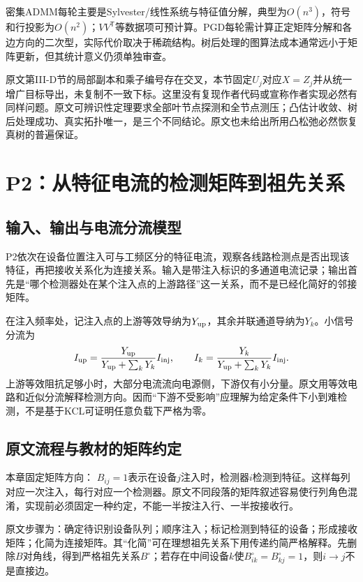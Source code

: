 密集ADMM每轮主要是Sylvester/线性系统与特征值分解，典型为$O(n^3)$，符号和行投影为$O(n^2)$；$VV^{\mathsf T}$等数据项可预计算。PGD每轮需计算正定矩阵分解和各边方向的二次型，实际代价取决于稀疏结构。树后处理的图算法成本通常远小于矩阵更新，但其统计意义仍须单独审查。

原文第III-D节的局部副本和乘子编号存在交叉，本节固定$U_j$对应$X=Z_j$并从统一增广目标导出，未复制不一致下标。这里没有复现作者代码或宣称作者实现必然有同样问题。原文可辨识性定理要求全部叶节点探测和全节点测压；凸估计收敛、树后处理成功、真实拓扑唯一，是三个不同结论。原文也未给出所用凸松弛必然恢复真树的普遍保证。

\section{P2：从特征电流的检测矩阵到祖先关系}
\label{sec:tb-P2}

\subsection{输入、输出与电流分流模型}

P2\citep{P2}依次在设备位置注入可与工频区分的特征电流，观察各线路检测点是否出现该特征，再把接收关系化为连接关系。输入是带注入标识的多通道电流记录；输出首先是“哪个检测器处在某个注入点的上游路径”这一关系，而不是已经化简好的邻接矩阵。

在注入频率处，记注入点的上游等效导纳为$Y_{\rm up}$，其余并联通道导纳为$Y_k$。小信号分流为
\begin{equation}
 I_{\rm up}=\frac{Y_{\rm up}}{Y_{\rm up}+\sum_kY_k}I_{\rm inj},
 \qquad
 I_k=\frac{Y_k}{Y_{\rm up}+\sum_kY_k}I_{\rm inj}.
 \label{eq:tb-P2-current}
\end{equation}
上游等效阻抗足够小时，大部分电流流向电源侧，下游仅有小分量。原文用等效电路和近似分流解释检测方向。因而“下游不受影响”应理解为给定条件下小到难检测，不是基于KCL可证明任意负载下严格为零。

\subsection{原文流程与教材的矩阵约定}

本章固定矩阵方向：
$B_{ij}=1$表示在设备$j$注入时，检测器$i$检测到特征。这样每列对应一次注入，每行对应一个检测器。原文不同段落的矩阵叙述容易使行列角色混淆，实现前必须固定一种约定，不能一半按注入行、一半按接收行。

原文步骤为：确定待识别设备队列；顺序注入；标记检测到特征的设备；形成接收矩阵；化简为连接矩阵。其“化简”可在理想祖先关系下用传递约简严格解释。先删除$B$对角线，得到严格祖先关系$B^\circ$；若存在中间设备$k$使$B^\circ_{ik}=B^\circ_{kj}=1$，则$i\to j$不是直接边。

